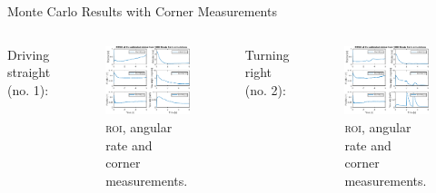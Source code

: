 \documentclass{beamer}
\newcommand{\roi}{\textsc{roi}\xspace}
\begin{document}
\begin{frame}{Monte Carlo Results with Corner Measurements}
	\begin{columns}[T]
	Driving straight (no. 1):
	\begin{figure}
		\includegraphics[width=\textwidth]{MC/30_MC_1000_Rmse}
		\caption{\roi, angular rate and corner measurements.}
	\end{figure}
	Turning right (no. 2):
	\begin{figure}
		\includegraphics[width=\textwidth]{MC/29_MC_1000_Rmse}
		\caption{\roi, angular rate and corner measurements.}
	\end{figure}
	\end{columns}
\end{frame}
\end{document}
